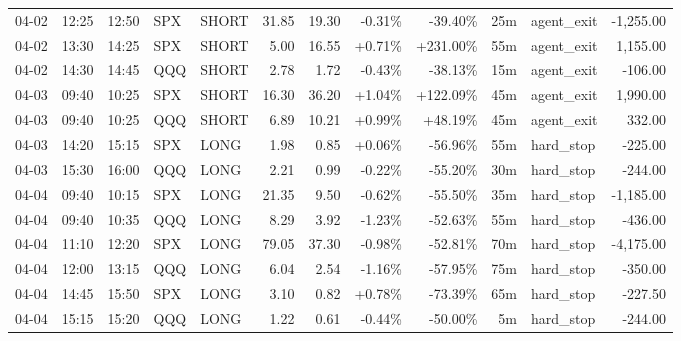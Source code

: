 \documentclass[11pt,a4paper,twoside]{article}
\begin{document}
\begin{center}
\begin{longtable}{>{\color{txtmain}}l l l l l r r r r r >{\color{txtmain}}l r}
04-02 & 12:25 & 12:50 & SPX & SHORT & 31.85 & 19.30 & \textcolor{lossred}{-0.31\%} & \textcolor{lossred}{-39.40\%} & 25m & agent\_exit & \textcolor{lossred}{-1,255.00} \\
04-02 & 13:30 & 14:25 & SPX & SHORT & 5.00 & 16.55 & \textcolor{wingreen}{+0.71\%} & \textcolor{wingreen}{+231.00\%} & 55m & agent\_exit & \textcolor{wingreen}{1,155.00} \\
04-02 & 14:30 & 14:45 & QQQ & SHORT & 2.78 & 1.72 & \textcolor{lossred}{-0.43\%} & \textcolor{lossred}{-38.13\%} & 15m & agent\_exit & \textcolor{lossred}{-106.00} \\
04-03 & 09:40 & 10:25 & SPX & SHORT & 16.30 & 36.20 & \textcolor{wingreen}{+1.04\%} & \textcolor{wingreen}{+122.09\%} & 45m & agent\_exit & \textcolor{wingreen}{1,990.00} \\
04-03 & 09:40 & 10:25 & QQQ & SHORT & 6.89 & 10.21 & \textcolor{wingreen}{+0.99\%} & \textcolor{wingreen}{+48.19\%} & 45m & agent\_exit & \textcolor{wingreen}{332.00} \\
04-03 & 14:20 & 15:15 & SPX & LONG & 1.98 & 0.85 & \textcolor{wingreen}{+0.06\%} & \textcolor{lossred}{-56.96\%} & 55m & hard\_stop & \textcolor{lossred}{-225.00} \\
04-03 & 15:30 & 16:00 & QQQ & LONG & 2.21 & 0.99 & \textcolor{lossred}{-0.22\%} & \textcolor{lossred}{-55.20\%} & 30m & hard\_stop & \textcolor{lossred}{-244.00} \\
04-04 & 09:40 & 10:15 & SPX & LONG & 21.35 & 9.50 & \textcolor{lossred}{-0.62\%} & \textcolor{lossred}{-55.50\%} & 35m & hard\_stop & \textcolor{lossred}{-1,185.00} \\
04-04 & 09:40 & 10:35 & QQQ & LONG & 8.29 & 3.92 & \textcolor{lossred}{-1.23\%} & \textcolor{lossred}{-52.63\%} & 55m & hard\_stop & \textcolor{lossred}{-436.00} \\
04-04 & 11:10 & 12:20 & SPX & LONG & 79.05 & 37.30 & \textcolor{lossred}{-0.98\%} & \textcolor{lossred}{-52.81\%} & 70m & hard\_stop & \textcolor{lossred}{-4,175.00} \\
04-04 & 12:00 & 13:15 & QQQ & LONG & 6.04 & 2.54 & \textcolor{lossred}{-1.16\%} & \textcolor{lossred}{-57.95\%} & 75m & hard\_stop & \textcolor{lossred}{-350.00} \\
04-04 & 14:45 & 15:50 & SPX & LONG & 3.10 & 0.82 & \textcolor{wingreen}{+0.78\%} & \textcolor{lossred}{-73.39\%} & 65m & hard\_stop & \textcolor{lossred}{-227.50} \\
04-04 & 15:15 & 15:20 & QQQ & LONG & 1.22 & 0.61 & \textcolor{lossred}{-0.44\%} & \textcolor{lossred}{-50.00\%} & 5m & hard\_stop & \textcolor{lossred}{-244.00} \\

\end{longtable}
\end{center}
\end{document}
